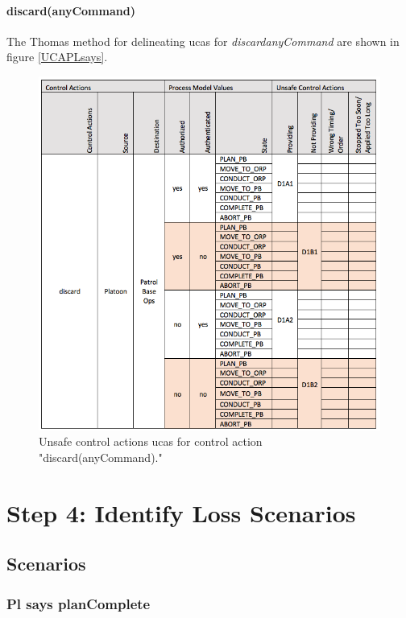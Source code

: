 \documentclass[../../main/main.tex]{subfiles}
\begin{document}
\paragraph*{discard(anyCommand)}
The Thomas method for delineating \glspl{uca} for \textit{discard{anyCommand}} are shown in figure \ref{UCAPLsays}.
\begin{figure}[ht!]
\begin{center}
\includegraphics[width=\linewidth]{../figures/ucadiscards}
\caption{Unsafe control actions \glspl{uca} for control action "discard(anyCommand)."}
\label{UCAdiscard}
\end{center}
\end{figure}
\clearpage
\section{Step 4: Identify Loss Scenarios}\label{chp:stpapb:scenarios}
\subsection{Scenarios}

\subsubsection*{Pl says planComplete}
\clearpage
\end{document}
